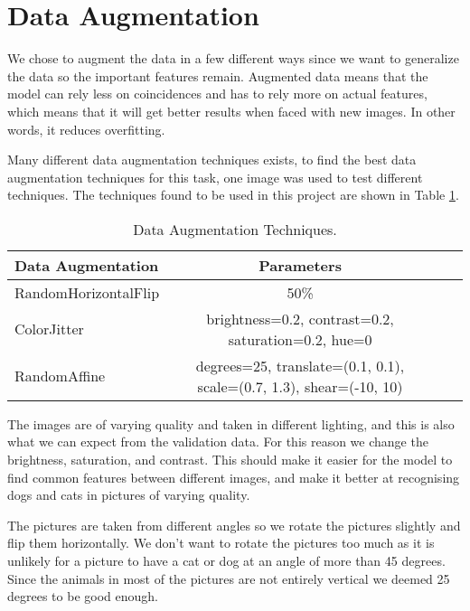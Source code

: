 \section{Data Augmentation}
We chose to augment the data in a few different ways since we want to generalize the data so the important features remain. 
Augmented data means that the model can rely less on coincidences and has to rely more on actual features, which means that it will get better results when faced with new images. In other words, it reduces overfitting.

Many different data augmentation techniques exists, to find the best data augmentation techniques for this task, one image was used to test different techniques.
The techniques found to be used in this project are shown in Table \ref{tab:data_augmentation}.

\begin{table}[H]
    \vspace*{-0.5cm}
    \centering
    \begin{tabular}{|l|c|c|c|}
    \hline
    \textbf{Data Augmentation} & \textbf{Parameters} \\ \hline
    RandomHorizontalFlip & 50\% \\ \hline
    ColorJitter & brightness=0.2, contrast=0.2, saturation=0.2, hue=0 \\ \hline
    RandomAffine & degrees=25, translate=(0.1, 0.1), scale=(0.7, 1.3), shear=(-10, 10) \\ \hline
    \end{tabular}
    \caption{Data Augmentation Techniques.}
    \label{tab:data_augmentation}
    \vspace*{-0.8cm}
\end{table}

The images are of varying quality and taken in different lighting, and this is also what we can expect from the validation data.
For this reason we change the brightness, saturation, and contrast. This should make it easier for the model to find common features between different images, and make it better at recognising dogs and cats in pictures of varying quality.

The pictures are taken from different angles so we rotate the pictures slightly and flip them horizontally. We don't want to rotate the pictures too much as it is unlikely for a picture to have a cat or dog at an angle of more than 45 degrees.
Since the animals in most of the pictures are not entirely vertical we deemed 25 degrees to be good enough.

